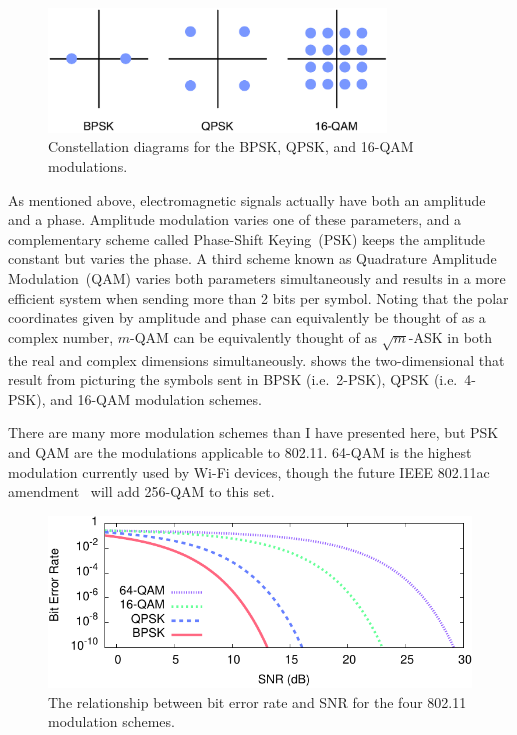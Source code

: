 \begin{figure}[t]
\centering
\includegraphics[width=0.8\textwidth]{figures/constellations}
\caption{\label{fig:constellations}Constellation diagrams for the BPSK, QPSK, and 16-QAM modulations.}
\end{figure}

As mentioned above, electromagnetic signals actually have both an amplitude and a phase. Amplitude modulation varies one of these parameters, and a complementary scheme called Phase-Shift Keying~(PSK) keeps the amplitude constant but varies the phase. A third scheme known as Quadrature Amplitude Modulation~(QAM) varies both parameters simultaneously and results in a more efficient system when sending more than 2 bits per symbol. Noting that the polar coordinates given by amplitude and phase can equivalently be thought of as a complex number, $m$-QAM can be equivalently thought of as $\sqrt{m}$-ASK in both the real and complex dimensions simultaneously.  shows the two-dimensional  that result from picturing the symbols sent in BPSK (i.e.\ 2-PSK), QPSK (i.e.\ 4-PSK), and 16-QAM modulation schemes.

There are many more modulation schemes than I have presented here, but PSK and QAM are the modulations applicable to 802.11.
64-QAM is the highest modulation currently used by Wi-Fi devices, though the future IEEE 802.11ac amendment~\cite{80211ac} will add 256-QAM to this set.

\begin{figure}[ht]
\centering
\includegraphics{calculations/snr_ber-crop}
\caption{\label{fig:mod_ber_snr}The relationship between bit error rate and SNR for the four 802.11 modulation schemes.}
\end{figure}


